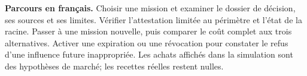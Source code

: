 \documentclass[11pt,a4paper]{article}
\begin{document}
\textbf{Parcours en français.} Choisir une mission et examiner le dossier de décision, ses sources et ses limites. Vérifier l'attestation limitée au périmètre et l'état de la racine. Passer à une mission nouvelle, puis comparer le coût complet aux trois alternatives. Activer une expiration ou une révocation pour constater le refus d'une influence future inappropriée. Les achats affichés dans la simulation sont des hypothèses de marché; les recettes réelles restent nulles.

{\small}



\end{document}
